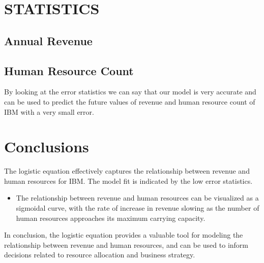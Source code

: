 \documentclass[aps,twocolumn,10pt,reprint]{revtex4}
\begin{document}
\section{STATISTICS}
\subsection{Annual Revenue}

\renewcommand{\arraystretch}{2}






\subsection{Human Resource Count}




By looking at the error statistics we can say that our model is very accurate and can be used to predict the future values of revenue and human resource count of IBM with a very small error. 

\section{Conclusions}

The logistic equation effectively captures the relationship between revenue and human resources for IBM. The model fit is indicated by the low error statistics.


\begin{itemize}
\item The relationship between revenue and human resources can be visualized as a sigmoidal curve, with the rate of increase in revenue slowing as the number of human resources approaches its maximum carrying capacity.

\end{itemize}
In conclusion, the logistic equation provides a valuable tool for modeling the relationship between revenue and human resources, and can be used to inform decisions related to resource allocation and business strategy.

\end{document}
